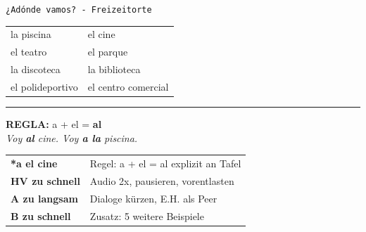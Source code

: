 \documentclass[11pt, a4paper]{article}
\begin{document}
\begin{minipage}[t]{0.48\textwidth}
\begin{tcolorbox}[
    colback=white,
    colframe=phase,
    title={\footnotesize\bfseries Tafelbild (Entwurf)},
    fonttitle=\bfseries,
    boxrule=0.5pt,
    top=2pt, bottom=2pt, left=4pt, right=4pt
]
\footnotesize
\texttt{¿Adónde vamos? - Freizeitorte}\\[0.2cm]
\begin{tabular}{@{}ll@{}}
la piscina & el cine \\
el teatro & el parque \\
la discoteca & la biblioteca \\
el polideportivo & el centro comercial \\
\end{tabular}

\vspace{0.2cm}
\hrule
\vspace{0.1cm}
\textbf{REGLA:} a + el = \textbf{al}\\
\textit{Voy \textbf{al} cine. Voy \textbf{a la} piscina.}
\end{tcolorbox}
\end{minipage}
\hfill
\begin{minipage}[t]{0.48\textwidth}
\begin{tcolorbox}[
    colback=white,
    colframe=spanisch,
    title={\footnotesize\bfseries Erwartete Schwierigkeiten},
    fonttitle=\bfseries,
    boxrule=0.5pt,
    top=2pt, bottom=2pt, left=4pt, right=4pt
]
\footnotesize
\begin{tabularx}{\textwidth}{@{}p{2.2cm}X@{}}
\textbf{*a el cine} & Regel: a + el = al explizit an Tafel \\
\textbf{HV zu schnell} & Audio 2x, pausieren, vorentlasten \\
\textbf{A zu langsam} & Dialoge kürzen, E.H. als Peer \\
\textbf{B zu schnell} & Zusatz: 5 weitere Beispiele \\
\end{tabularx}
\end{tcolorbox}
\end{minipage}
\end{document}

